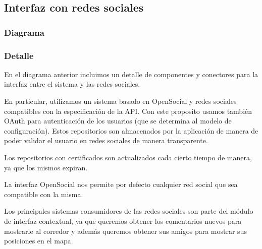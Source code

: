 \subsection{Interfaz con redes sociales}
\subsubsection{Diagrama}


\subsubsection{Detalle}

En el diagrama anterior incluimos un detalle de componentes y 
conectores para la interfaz entre el sistema y las redes sociales.

En particular, utilizamos un sistema basado en OpenSocial y redes
sociales compatibles con la especificación de la API. Con este
proposito usamos también OAuth para autenticación de los usuarios
(que se determina al modelo de configuración). Estos repositorios
son almacenados por la aplicación de manera de poder validar el usuario
en redes sociales de manera transparente. 

Los repositorios con certificados son actualizados cada cierto
tiempo de manera, ya que los mismos expiran.

La interfaz OpenSocial nos permite por defecto cualquier red social
que sea compatible con la misma. 

Los principales sistemas consumidores de las redes sociales son
parte del módulo de interfaz contextual, ya que queremos obtener
los comentarios nuevos para mostrarle al corredor y además
queremos obtener sus amigos para mostrar sus posiciones en el mapa.
